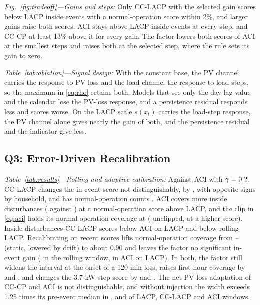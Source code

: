 \documentclass[conference,a4paper]{IEEEtran}
\begin{document}
\emph{Fig.~\ref{fig:tradeoff}---Gains and steps:} Only CC-LACP with the selected gain scores below LACP inside
events with a normal-operation score within 2\%, and larger gains raise both scores. ACI stays above LACP inside
events at every step, and CC-CP at least 13\% above it for every gain. The factor lowers both scores of ACI at the
smallest steps and raises both at the selected step, where the rule sets its gain to zero.

\begin{table}[t]
\caption{Variants of the consistency signal, gains selected by the same rule. Net adaptation to injected PV
loss and load steps and in-event score against LACP. $^{*}$95\% interval excludes zero.}
\label{tab:ablation}
\centering
\scriptsize
\setlength{\tabcolsep}{2.4pt}
\renewcommand{\arraystretch}{0.90}
\end{table}

\emph{Table~\ref{tab:ablation}---Signal design:} With the constant base, the PV channel carries the response to
PV loss and the load channel the response to load steps, so the maximum in \eqref{eq:rho} retains both. Models
that see only the day-lag value and the calendar lose the PV-loss response, and a persistence residual responds
less and scores worse. On the LACP scale $s(x_t)$ carries the load-step response, the PV channel alone gives
nearly the gain of both, and the persistence residual and the indicator give less.

\subsection{Q3: Error-Driven Recalibration}
\emph{Table~\ref{tab:results}---Rolling and adaptive calibration:} Against ACI with $\gamma=0.2$, CC-LACP
changes the in-event score not distinguishably, by \relCCLACPvsACI{} \relCCLACPvsACICI, with opposite signs by
household, and has normal-operation counts \dmCCLACPvsACI. ACI covers more inside disturbances (\inACIPICP{} against
\inCCLACPPICP) at a normal-operation score \abscleanrelACI{} above LACP, and the clip in \eqref{eq:aci} holds its
normal-operation coverage at \cleanACIPICP{} (\unclipPICP{} unclipped, at a higher score). Inside disturbances
CC-LACP scores \absrelCCLACPvsACIL{} below ACI on LACP and \absrelCCLACPvsROLLLACP{} below rolling LACP.
Recalibrating on recent scores lifts normal-operation coverage from \cleanStaticMin--\cleanStaticMax{} (static,
lowered by drift) to about 0.90 and leaves the factor no significant in-event gain
(\relROLLCCLACPvsROLLLACP{} \relROLLCCLACPvsROLLLACPCI{} in the rolling window, \relACICCLvsACIL{}
\relACICCLvsACILCI{} in ACI on LACP). In both, the factor still widens the interval at the onset of a 120-min loss,
raises first-hour coverage by \covHourFROLL{} and \covHourFACIL, and changes the 3.7-kW-step score by \evfacROLL{}
and \evfacACIL. The net PV-loss adaptation of CC-CP and ACI is not distinguishable, and without injection the width
exceeds 1.25 times its pre-event median in \faLACP, \faCCLACP{} and \faACI{} of LACP, CC-LACP and ACI windows.
\end{document}
